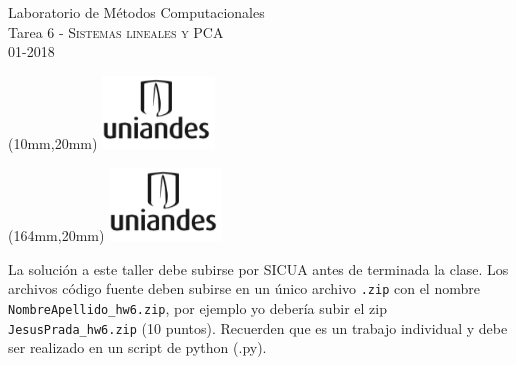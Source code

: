 \documentclass[11pt,letterpaper]{exam}
\begin{document}
\begin{center}
{\Large Laboratorio de M\'etodos Computacionales} \\
Tarea 6 - \textsc{Sistemas lineales y PCA}\\
01-2018\\
\end{center}

\begin{textblock*}{40mm}(10mm,20mm)
  \includegraphics[width=3cm]{logoUniandes}
\end{textblock*}

\begin{textblock*}{40mm}(164mm,20mm)
  \includegraphics[width=3cm]{logoUniandes}
\end{textblock*}

\vspace{0.3cm}

\noindent
La soluci\'on a este taller debe subirse por SICUA antes de terminada la clase.
\noindent
Los archivos c\'odigo fuente deben subirse en un \'unico archivo
\verb".zip" con el nombre \verb"NombreApellido_hw6.zip", por ejemplo
yo deber\'ia subir el zip \verb"JesusPrada_hw6.zip" (10 puntos). Recuerden que es un trabajo individual y debe ser realizado en un script de python (.py).

\vspace{0.3cm}
\end{document}
